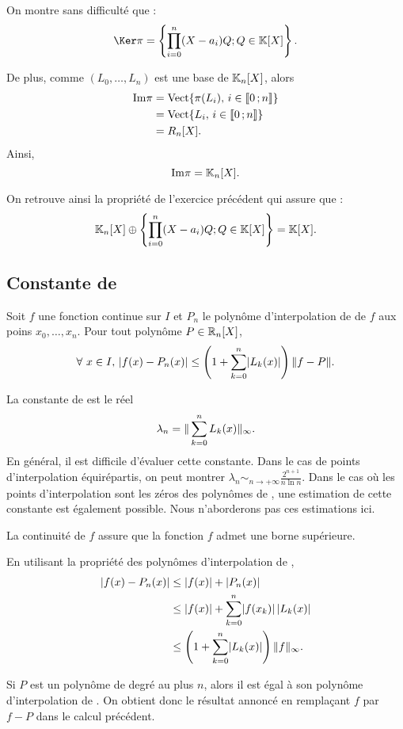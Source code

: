 \begin{remarque}
On montre sans difficulté que :
\[
\Ker \pi = \left\{ \prod_{i=0}^n (X - a_i) Q ; Q \in \K[X] \right\}.
\]

De plus, comme $(L_0,\ldots,L_n)$ est une base de $\mathbb{K}_n[X]$, alors
\begin{align*}
\mathrm{Im} \pi &= \mathrm{Vect}\{\pi(L_i),\, i \in \llbracket 0\,; n \rrbracket\} \\
&= \mathrm{Vect}\{L_i,\, i \in \llbracket 0\,; n \rrbracket\} \\
&= R_n[X].
\end{align*}
Ainsi,
\[
\mathrm{Im} \pi = \mathbb{K}_n[X].
\]

On retrouve ainsi la propriété de l'exercice précédent qui assure que :
\[
\mathbb{K}_n[X] \oplus \left\{ \prod_{i=0}^n (X - a_i) Q ; Q \in \mathbb{K}[X] \right\} = \mathbb{K}[X].
\]
\end{remarque}

\subsection{Constante de }

\begin{theo}
Soit $f$ une fonction continue sur $I$ et $P_n$ le polynôme d'interpolation de  de $f$ aux poins $x_0,\ldots,x_n$. Pour tout polynôme $P \in \mathbb{R}_n[X]$,
\[
\forall\, x \in I,\, \module{f(x) - P_n(x)} \leq \left(1 + \sum_{k=0}^n \module{L_k(x)}\right) \norme{f - P}.
\]
\end{theo}

\begin{remarque}
La constante de  est le réel
\[
\lambda_n = \Vert \sum_{k=0}^n L_k(x) \Vert_\infty.
\]
En général, il est difficile d'évaluer cette constante. Dans le cas de points d'interpolation équirépartis, on peut montrer $\lambda_n \sim_{n\to+\infty} \frac{2^{n+1}}{n \ln n}$. Dans le cas où les points d'interpolation sont les zéros des polynômes de , une estimation de cette constante est également possible. Nous n'aborderons pas ces estimations ici.
\end{remarque}

\begin{elemsolution}
\cite{mines_2-mp-2001}
La continuité de $f$ assure que la fonction $f$ admet une borne supérieure.

En utilisant la propriété des polynômes d'interpolation de ,
\begin{align*}
\mathopen{}\left| f(x) - P_n(x) \right|
&\leq \mathopen{}\left| f(x) \right| + \mathopen{}\left| P_n(x) \right|\\
&\leq \mathopen{}\left| f(x) \right| + \sum_{k=0}^n \mathopen{}\left| f(x_k) \right| \mathopen{}\left| L_k(x) \right|\\
&\leq \left(1 + \sum_{k=0}^n \mathopen{}\left| L_k(x) \right|\right) \Vert f \Vert_\infty.
\end{align*}

Si $P$ est un polynôme de degré au plus $n$, alors il est égal à son polynôme d'interpolation de . On obtient donc le résultat annoncé en remplaçant $f$ par $f - P$ dans le calcul précédent.
\end{elemsolution}

